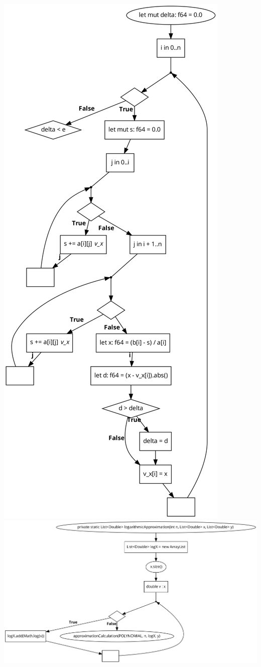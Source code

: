 \documentclass{article}
\begin{document}
             \\
             \includegraphics[scale=0.2]{lin_calc.png}
             \\
             \includegraphics[scale=0.2]{log_approx.png}
\end{document}
